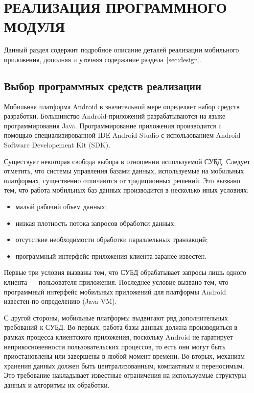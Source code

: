 \section[Реализация программного модуля]{%
  РЕАЛИЗАЦИЯ ПРОГРАММНОГО МОДУЛЯ
}\label{sec:implementation}

Данный раздел содержит подробное описание деталей реализации
мобильного приложения, дополняя и уточняя
содержание раздела~\ref{sec:design}.

\subsection{Выбор программных средств реализации}

Мобильная платформа Android в значительной мере
определяет набор средств разработки. Большинство Android-приложений
разрабатываются на языке программирования Java. Программирование
приложения производится c помощью специализированной
IDE Android Studio с использованием Android Software Developement Kit (SDK).

Существует некоторая свобода выбора в отношении используемой СУБД.
Следует отметить, что системы управления базами данных,
используемые на мобильных платформах, существенно отличаются
от традиционных решений.
Это вызвано тем, что работа мобильных баз данных производится в
несколько иных условиях:
\begin{itemize}
  \item малый рабочий объем данных;
  \item низкая плотность потока запросов обработки данных;
  \item отсутствие необходимости обработки параллельных транзакций;
  \item программный интерфейс приложения-клиента заранее известен.
\end{itemize}

Первые три условия вызваны тем, что СУБД обрабатывает запросы
лишь одного клиента --- пользователя приложения.
Последнее условие вызвано тем, что программный интерфейс мобильных
приложений для платформы Android известен по определению (Java VM).

С другой стороны, мобильные платформы выдвигают ряд
дополнительных требований к СУБД.
Во-первых, работа базы данных должна производиться в рамках
процесса клиентского приложения, поскольку Android не гаратирует
неприкосновенности пользовательских процессов, то есть они могут быть
приостановлены или завершены в любой момент времени.
Во-вторых, механизм хранения данных должен быть централизованным,
компактным и переносимым. Это требование накладывает
известные ограничения на используемые структуры данных
и алгоритмы их обработки.

